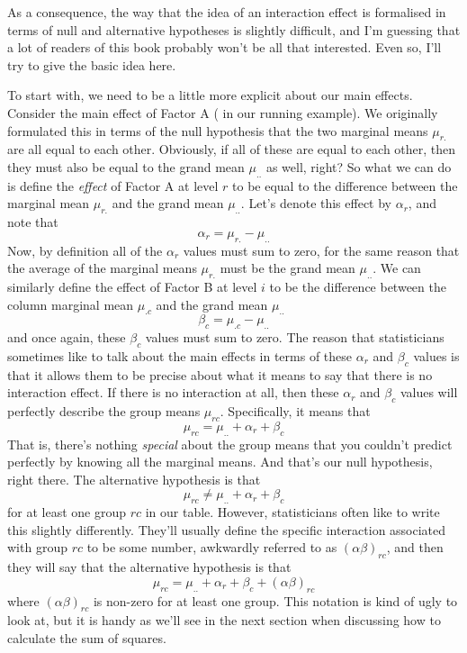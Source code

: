 \vspace{0.5cm}
\begin{mdframed}[style=MyFrame,nobreak=false]
As a consequence, the way that the idea of an interaction effect is formalised in terms of null and alternative hypotheses is slightly difficult, and I'm guessing that a lot of readers of this book probably won't be all that interested. Even so, I'll try to give the basic idea here.

To start with, we need to be a little more explicit about our main effects. Consider the main effect of Factor A ( in our running example). We originally formulated this in terms of the null hypothesis that the two marginal means $\mu_{r.}$ are all equal to each other. Obviously, if all of these are equal to each other, then they must also be equal to the grand mean $\mu_{..}$ as well, right? So what we can do is define the {\it effect} of Factor A at level $r$ to be equal to the difference between the marginal mean $\mu_{r.}$ and the grand mean $\mu_{..}$.  
Let's denote this effect by $\alpha_r$, and note that
$$
\alpha_r  = \mu_{r.} - \mu_{..} 
$$
Now, by definition all of the $\alpha_r$ values must sum to zero, for the same reason that the average of the marginal means $\mu_{r.}$ must be the grand mean $\mu_{..}$. We can similarly define the effect of Factor B at level $i$ to be the difference between the column marginal mean $\mu_{.c}$ and the grand mean $\mu_{..}$
$$
\beta_c = \mu_{.c} - \mu_{..}
$$
and once again, these $\beta_c$ values must sum to zero. The reason that statisticians sometimes like to talk about the main effects in terms of these $\alpha_r$ and $\beta_c$ values is that it allows them to be precise about what it means to say that there is no interaction effect. If there is no interaction at all, then these $\alpha_r$ and $\beta_c$ values will perfectly describe the group means $\mu_{rc}$. Specifically, it means that
$$
\mu_{rc} = \mu_{..} + \alpha_r + \beta_c 
$$
That is, there's nothing {\it special} about the group means that you couldn't predict perfectly by knowing all the marginal means. And that's our null hypothesis, right there. The alternative hypothesis is that
$$
\mu_{rc} \neq \mu_{..} + \alpha_r + \beta_c 
$$
for at least one group $rc$ in our table. However, statisticians often like to write this slightly differently. They'll usually define the specific interaction associated with group $rc$ to be some number, awkwardly referred to as $(\alpha\beta)_{rc}$, and then they will say that the alternative hypothesis is that 
$$\mu_{rc} = \mu_{..} + \alpha_r + \beta_c + (\alpha\beta)_{rc}$$
where $(\alpha\beta)_{rc}$ is non-zero for at least one group. This notation is kind of ugly to look at, but it is handy as we'll see in the next section when discussing how to calculate the sum of squares.



\end{mdframed}
